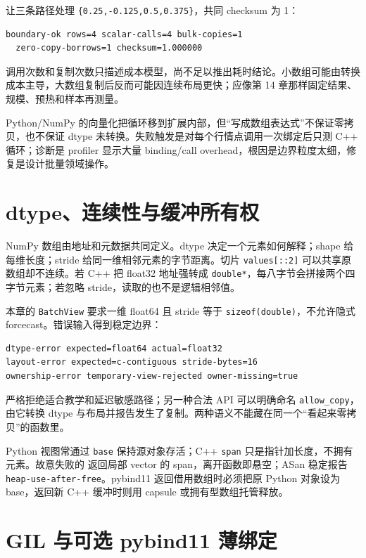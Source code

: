 让三条路径处理 \texttt{\{0.25,-0.125,0.5,0.375\}}，共同 checksum 为 1：

\begin{lstlisting}[numbers=none]
boundary-ok rows=4 scalar-calls=4 bulk-copies=1
  zero-copy-borrows=1 checksum=1.000000
\end{lstlisting}

调用次数和复制次数只描述成本模型，尚不足以推出耗时结论。小数组可能由转换成本主导，大数组复制后反而可能因连续布局更快；应像第 14 章那样固定结果、规模、预热和样本再测量。

Python/NumPy 的向量化把循环移到扩展内部，但“写成数组表达式”不保证零拷贝，也不保证 dtype 未转换。失败触发是对每个行情点调用一次绑定后只测 C++ 循环；诊断是 profiler 显示大量 binding/call overhead，根因是边界粒度太细，修复是设计批量领域操作。

\section{dtype、连续性与缓冲所有权}

NumPy 数组由地址和元数据共同定义。dtype 决定一个元素如何解释；shape 给每维长度；stride 给同一维相邻元素的字节距离。切片 \texttt{values[::2]} 可以共享原数组却不连续。若 C++ 把 float32 地址强转成 \texttt{double*}，每八字节会拼接两个四字节元素；若忽略 stride，读取的也不是逻辑相邻值。

本章的 \texttt{BatchView} 要求一维 float64 且 stride 等于 \texttt{sizeof(double)}，不允许隐式 forcecast。错误输入得到稳定边界：

\begin{lstlisting}[numbers=none]
dtype-error expected=float64 actual=float32
layout-error expected=c-contiguous stride-bytes=16
ownership-error temporary-view-rejected owner-missing=true
\end{lstlisting}

严格拒绝适合教学和延迟敏感路径；另一种合法 API 可以明确命名 \texttt{allow\_copy}，由它转换 dtype 与布局并报告发生了复制。两种语义不能藏在同一个“看起来零拷贝”的函数里。

Python 视图常通过 \texttt{base} 保持源对象存活；C++ \texttt{span} 只是指针加长度，不拥有元素。故意失败的  返回局部 vector 的 span，离开函数即悬空；ASan 稳定报告 \texttt{heap-use-after-free}。pybind11 返回借用数组时必须把原 Python 对象设为 base，返回新 C++ 缓冲时则用 capsule 或拥有型数组托管释放。

\section{GIL 与可选 pybind11 薄绑定}

